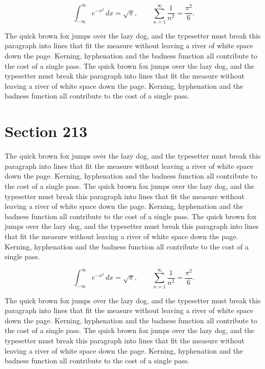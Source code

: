 \documentclass{article}
\begin{document}
\begin{equation}
\int_{-\infty}^{\infty} e^{-x^{2}}\,dx = \sqrt{\pi}, \qquad
\sum_{n=1}^{\infty} \frac{1}{n^{2}} = \frac{\pi^{2}}{6}.
\end{equation}

The quick brown fox jumps over the lazy dog, and the typesetter must break this paragraph into lines that fit the measure without leaving a river of white space down the page. Kerning, hyphenation and the badness function all contribute to the cost of a single pass. The quick brown fox jumps over the lazy dog, and the typesetter must break this paragraph into lines that fit the measure without leaving a river of white space down the page. Kerning, hyphenation and the badness function all contribute to the cost of a single pass. 
\section{Section 213}
The quick brown fox jumps over the lazy dog, and the typesetter must break this paragraph into lines that fit the measure without leaving a river of white space down the page. Kerning, hyphenation and the badness function all contribute to the cost of a single pass. The quick brown fox jumps over the lazy dog, and the typesetter must break this paragraph into lines that fit the measure without leaving a river of white space down the page. Kerning, hyphenation and the badness function all contribute to the cost of a single pass. The quick brown fox jumps over the lazy dog, and the typesetter must break this paragraph into lines that fit the measure without leaving a river of white space down the page. Kerning, hyphenation and the badness function all contribute to the cost of a single pass. 

\begin{equation}
\int_{-\infty}^{\infty} e^{-x^{2}}\,dx = \sqrt{\pi}, \qquad
\sum_{n=1}^{\infty} \frac{1}{n^{2}} = \frac{\pi^{2}}{6}.
\end{equation}

The quick brown fox jumps over the lazy dog, and the typesetter must break this paragraph into lines that fit the measure without leaving a river of white space down the page. Kerning, hyphenation and the badness function all contribute to the cost of a single pass. The quick brown fox jumps over the lazy dog, and the typesetter must break this paragraph into lines that fit the measure without leaving a river of white space down the page. Kerning, hyphenation and the badness function all contribute to the cost of a single pass. 
\end{document}
